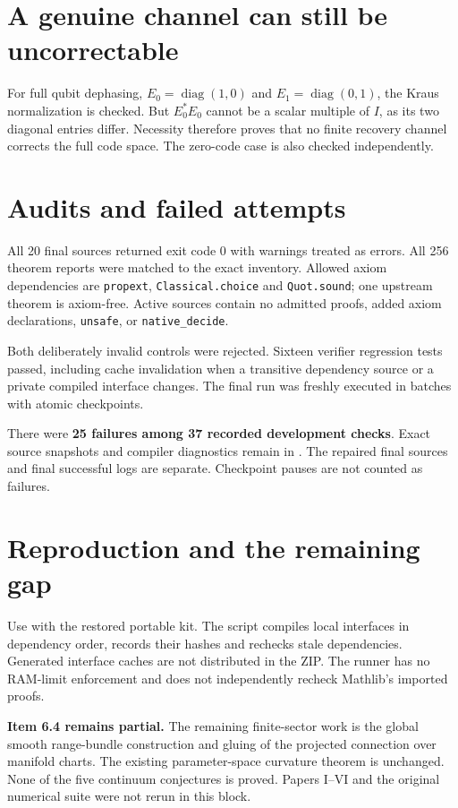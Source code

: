 \documentclass[10pt,letterpaper]{article}
\begin{document}
\section*{A genuine channel can still be uncorrectable}
For full qubit dephasing, $E_0=\operatorname{diag}(1,0)$ and $E_1=\operatorname{diag}(0,1)$, the Kraus normalization is checked. But $E_0^*E_0$ cannot be a scalar multiple of $I$, as its two diagonal entries differ. Necessity therefore proves that no finite recovery channel corrects the full code space. The zero-code case is also checked independently.

\section*{Audits and failed attempts}
All 20 final sources returned exit code 0 with warnings treated as errors. All 256 theorem reports were matched to the exact inventory. Allowed axiom dependencies are \texttt{propext}, \texttt{Classical.choice} and \texttt{Quot.sound}; one upstream theorem is axiom-free. Active sources contain no admitted proofs, added axiom declarations, \texttt{unsafe}, or \texttt{native\_decide}.

Both deliberately invalid controls were rejected. Sixteen verifier regression tests passed, including cache invalidation when a transitive dependency source or a private compiled interface changes. The final run was freshly executed in batches with atomic checkpoints.

There were \textbf{25 failures among 37 recorded development checks}. Exact source snapshots and compiler diagnostics remain in . The repaired final sources and final successful logs are separate. Checkpoint pauses are not counted as failures.

\section*{Reproduction and the remaining gap}
Use  with the restored portable kit. The script compiles local interfaces in dependency order, records their hashes and rechecks stale dependencies. Generated interface caches are not distributed in the ZIP. The runner has no RAM-limit enforcement and does not independently recheck Mathlib's imported proofs.

\textbf{Item 6.4 remains partial.} The remaining finite-sector work is the global smooth range-bundle construction and gluing of the projected connection over manifold charts. The existing parameter-space curvature theorem is unchanged. None of the five continuum conjectures is proved. Papers I--VI and the original numerical suite were not rerun in this block.
\end{document}
